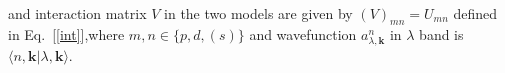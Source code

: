 \documentclass[10pt]{ruthesis}
\begin{document}
{\begin{multline}
\end{multline}
and interaction matrix $V$ in the two models are given by $(V)_{mn}=U_{mn}$ defined in Eq.~[\ref{int}],where $m,n\in\{p,d,(s)\}$ and wavefunction $a^n_{\lambda,\mathbf k}$ in $\lambda$ band is $\langle n,\mathbf k|\lambda,\mathbf k\rangle$.\\

}
\end{document}
